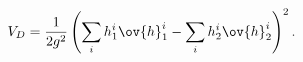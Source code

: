 \begin{equation}
V_D=\frac{1}{2g^2}\left( \sum_i h^i_1 \ov{h}^i_1 - \sum_i h^i_2 \ov{h}^i_2 \right)^2.
\label{EqDtermPotential}
\end{equation}

